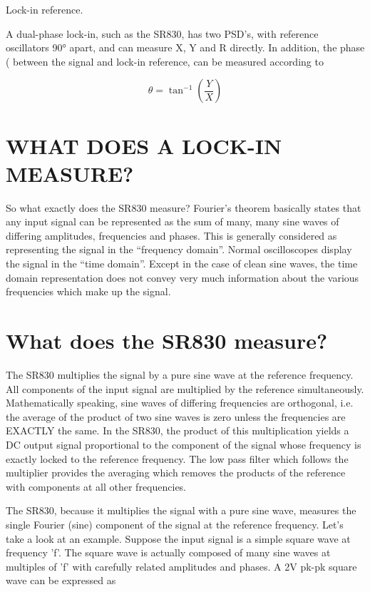 \documentclass{../lab}
\begin{document}
Lock-in reference.

A dual-phase lock-in, such as the SR830, has two PSD's, with reference oscillators 90° apart, and can measure X, Y and R directly. In addition, the phase ( between the signal and lock-in reference, can be measured according to

\begin{equation}
    \theta = \tan^{-1} \left (\frac {Y}{X} \right)
\end{equation}
\section{WHAT DOES A LOCK-IN MEASURE?}

So what exactly does the SR830 measure? Fourier's theorem basically states that any input signal can be represented as the sum of many, many sine waves of differing amplitudes, frequencies and phases. This is generally considered as representing the signal in the ``frequency domain''. Normal oscilloscopes display the signal in the ``time domain''. Except in the case of clean sine waves, the time domain representation does not convey very much information about the various frequencies which make up the signal.

\section{What does the SR830 measure?}

The SR830 multiplies the signal by a pure sine wave at the reference frequency. All components of the input signal are multiplied by the reference simultaneously. Mathematically speaking, sine waves of differing frequencies are orthogonal, i.e. the average of the product of two sine waves is zero unless the frequencies are EXACTLY the same. In the SR830, the product of this multiplication yields a DC output signal proportional to the component of the signal whose frequency is exactly locked to the reference frequency. The low pass filter which follows the multiplier provides the averaging which removes the products of the reference with components at all other frequencies.

The SR830, because it multiplies the signal with a pure sine wave, measures the single Fourier (sine) component of the signal at the reference frequency. Let's take a look at an example. Suppose the input signal is a simple square wave at frequency 'f'. The square wave is actually composed of many sine waves at multiples of 'f' with carefully related amplitudes and phases. A 2V pk-pk square wave can be expressed as
\end{document}
